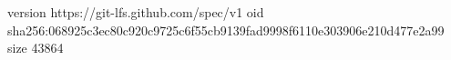 version https://git-lfs.github.com/spec/v1
oid sha256:068925c3ec80c920c9725c6f55cb9139fad9998f6110e303906e210d477e2a99
size 43864
